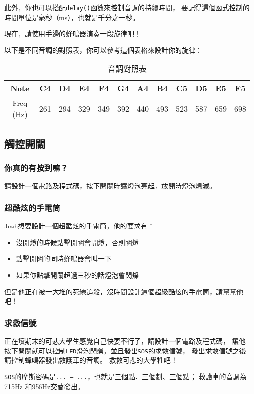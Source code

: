 \documentclass[12pt,a4paper]{article}
\begin{document}
此外，你也可以搭配\texttt{delay()}函數來控制音調的持續時間，
要記得這個函式控制的時間單位是毫秒（ms），也就是千分之一秒。

現在，請使用手邊的蜂鳴器演奏一段旋律吧！

以下是不同音調的對照表，你可以參考這個表格來設計你的旋律：
\begin{table}[h!]
\centering
\begin{tabular}{|c|c|c|c|c|c|c|c|c|c|c|c|}
\hline
Note & C4 & D4 & E4 & F4 & G4 & A4 & B4 & C5 & D5 & E5 & F5 \\ \hline
Freq (Hz) & 261 & 294 & 329 & 349 & 392 & 440 & 493 & 523 & 587 & 659 & 698 \\ \hline
\end{tabular}
\caption{音調對照表}
\label{tab:freq_table}
\end{table}

\subsection{觸控開關}
\subsubsection{你真的有按到嘛？}
請設計一個電路及程式碼，按下開關時讓燈泡亮起，放開時燈泡熄滅。

\subsubsection{超酷炫的手電筒}
Josh想要設計一個超酷炫的手電筒，他的要求有：
\begin{itemize}
    \item 沒開燈的時候點擊開關會開燈，否則關燈
    \item 點擊開關的同時蜂鳴器會叫一下
    \item 如果你點擊開關超過三秒的話燈泡會閃爍
\end{itemize}

但是他正在被一大堆的死線追殺，沒時間設計這個超級酷炫的手電筒，請幫幫他吧！

\subsubsection{求救信號}
正在讀期末的可悲大學生感覺自己快要不行了，請設計一個電路及程式碼，
讓他按下開關就可以控制\texttt{LED}燈泡閃爍，並且發出\texttt{SOS}的求救信號，
發出求救信號之後請控制蜂鳴器發出救護車的音調。
救救可悲的大學牲吧！

\texttt{SOS}的摩斯密碼是\texttt{... --- ...}，也就是三個點、三個劃、三個點；
救護車的音調為715Hz 和956Hz交替發出。
\end{document}
